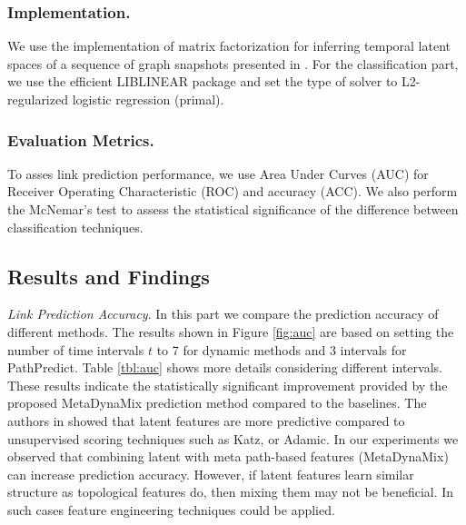 \subsubsection{Implementation.} We use the implementation of matrix factorization for inferring temporal latent spaces of a sequence of graph snapshots presented in \cite{Zhu2016}. For the classification part, we use the efficient LIBLINEAR \cite{fan2008liblinear} package and set the type of solver to L2-regularized logistic regression (primal). %


\subsubsection{Evaluation Metrics.} 

To asses link prediction performance, we use Area Under Curves (AUC) for Receiver Operating Characteristic (ROC) \cite{davis2006relationship} %
and accuracy (ACC). %
We also perform the McNemar's test \cite{mcnemar1947note} to assess the statistical significance of the difference between classification techniques.

\subsection{Results and Findings}

\textit{Link Prediction Accuracy}. In this part we compare the prediction accuracy of different methods. The  results shown in Figure \ref{fig:auc} are based on setting the number of time intervals $t$ to 7 for dynamic methods and 3 intervals for PathPredict. Table \ref{tbl:auc} shows more details considering different intervals. These results indicate the statistically significant improvement provided by the proposed MetaDynaMix prediction method compared to the baselines. The authors in \cite{menon2011link,Zhu2016} showed that latent features are more predictive compared to unsupervised scoring techniques such as Katz, or Adamic. In our experiments we observed that combining latent with meta path-based features (MetaDynaMix) can increase prediction accuracy. However, if latent features learn similar structure as topological features do, then mixing them may not be beneficial. In such cases feature engineering techniques could be applied. 

